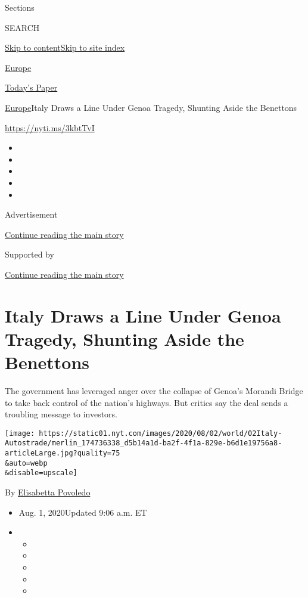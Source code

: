 Sections

SEARCH

\protect\hyperlink{site-content}{Skip to
content}\protect\hyperlink{site-index}{Skip to site index}

\href{https://www.nytimes.com/section/world/europe}{Europe}

\href{https://myaccount.nytimes.com/auth/login?response_type=cookie\&client_id=vi}{}

\href{https://www.nytimes.com/section/todayspaper}{Today's Paper}

\href{/section/world/europe}{Europe}\textbar{}Italy Draws a Line Under
Genoa Tragedy, Shunting Aside the Benettons

\url{https://nyti.ms/3kbtTvI}

\begin{itemize}
\item
\item
\item
\item
\item
\end{itemize}

Advertisement

\protect\hyperlink{after-top}{Continue reading the main story}

Supported by

\protect\hyperlink{after-sponsor}{Continue reading the main story}

\hypertarget{italy-draws-a-line-under-genoa-tragedy-shunting-aside-the-benettons}{%
\section{Italy Draws a Line Under Genoa Tragedy, Shunting Aside the
Benettons}\label{italy-draws-a-line-under-genoa-tragedy-shunting-aside-the-benettons}}

The government has leveraged anger over the collapse of Genoa's Morandi
Bridge to take back control of the nation's highways. But critics say
the deal sends a troubling message to investors.

\texttt{[image: https://static01.nyt.com/images/2020/08/02/world/02Italy-Autostrade/merlin\_174736338\_d5b14a1d-ba2f-4f1a-829e-b6d1e19756a8-articleLarge.jpg?quality=75\\\&auto=webp\\\&disable=upscale]}

By \href{https://www.nytimes.com/by/elisabetta-povoledo}{Elisabetta
Povoledo}

\begin{itemize}
\item
  Aug. 1, 2020Updated 9:06 a.m. ET
\item
  \begin{itemize}
  \item
  \item
  \item
  \item
  \item
  \end{itemize}
\end{itemize}

